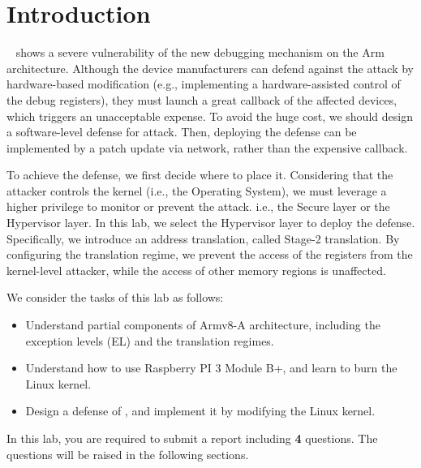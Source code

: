\section{Introduction}
\label{sec:intro}


\TheName{}~\cite{ning2019understanding} shows a severe vulnerability of the new debugging mechanism on the Arm architecture.
Although the device manufacturers can defend against the attack by hardware-based modification (e.g., implementing a hardware-assisted control of the debug registers),
they must launch a great callback of the affected devices, which triggers an unacceptable expense.
To avoid the huge cost, we should design a software-level defense for \TheName{} attack.
Then, deploying the defense can be implemented by a patch update via network, rather than the expensive callback.

To achieve the defense, we first decide where to place it.
Considering that the attacker controls the kernel (i.e., the Operating System),
we must leverage a higher privilege to monitor or prevent the \TheName{} attack. i.e., the Secure layer or the Hypervisor layer.
In this lab, we select the Hypervisor layer to deploy the defense. Specifically, we introduce an address translation, called Stage-2 translation. By configuring the translation regime, we prevent the access of the registers from the kernel-level attacker, while the access of other memory regions is unaffected.

We consider the tasks of this lab as follows:

\begin{itemize}
	\item Understand partial components of Armv8-A architecture, including the exception levels (EL) and the translation regimes.
	\item Understand how to use Raspberry PI 3 Module B+, and learn to burn the Linux kernel.
	\item Design a defense of \TheName{}, and implement it by modifying the Linux kernel. 
\end{itemize}

In this lab, you are required to submit a report including \textbf{4} 
questions. The questions will 
be raised in the following sections.